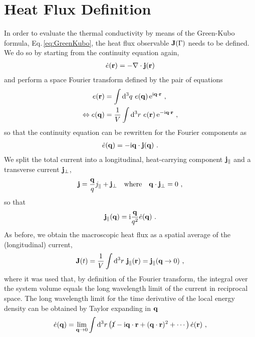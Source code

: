 \section{Heat Flux Definition}
In order to evaluate the thermal conductivity by means of the Green-Kubo formula, Eq.\,\eqref{eq:GreenKubo}, the  heat flux observable ${\bf J} (\Gamma)$ needs to be defined. We do so by starting from the continuity equation again,
\begin{align}
	\dot{e} (\b r) = - \b \nabla \cdot \b j (\b r)
	\label{eq:hf.cont}
\end{align}
and perform a space Fourier transform defined by the pair of equations
\begin{align}
	e(\b r) 
		&= \int \d^3 q ~ e(\b q) \, {\rm e}^{\im \b q \cdot \b r} ~,
		\label{eq:hf.ft.r} \\
	\Leftrightarrow
	e(\b q) 
		&= \frac{1}{V} \int \d^3 r ~ e(\b r) \, {\rm e}^{-\im \b q \cdot \b r} ~,
	\label{eq:hf.ft.2}
\end{align}
so that the continuity equation can be rewritten for the Fourier components as
\begin{align}
	\dot{e} (\b q)
		= - \im \b q \cdot \b j (\b q)~.
	\label{eq:hf.ft.cont.q}
\end{align}
We split the total current into a longitudinal, heat-carrying component ${\bf j}_{\parallel}$ and a transverse current ${\bf j}_{\perp}$,
\begin{align}
	{\bf j} = \frac{{\bf q}}{q} j_{\parallel} + {\bf j}_{\perp} \quad\text{where}\quad {\bf q} \cdot {\bf j}_{\perp} = 0~,
\end{align}
so that
\begin{align}
	\b j_{\parallel} (\b q)
		= \im \frac{\b q}{q^2} \dot{e} (\b q)~.
  \label{eq:hf.j.parallel}
\end{align}
As before, we obtain the macroscopic heat flux as a spatial average of the (longitudinal) current,
\begin{align}
	\b J (t) = \frac{1}{V} \int \d^3 r ~ \b j_{\parallel} (\b r) = \b j_{\parallel} (\b q \to 0)~,
	\label{eq:hf.J.1}
\end{align}
where it was used that, by definition of the Fourier transform, the integral over the system volume equals the long wavelength limit of the current in reciprocal space. The long wavelength limit for the time derivative of the local energy density can be obtained by Taylor expanding in ${\bf q}$
\begin{align}
	\dot{e} (\b q) 
		= \lim_{\b q \to 0} \int \d^3 r \left(\cancel{1} - \im \b q \cdot \b r + (\b q \cdot \b r)^2 + \cdots \right) \dot{e} (\b r)~,
	\label{eq:hf.e.lw}
\end{align}
